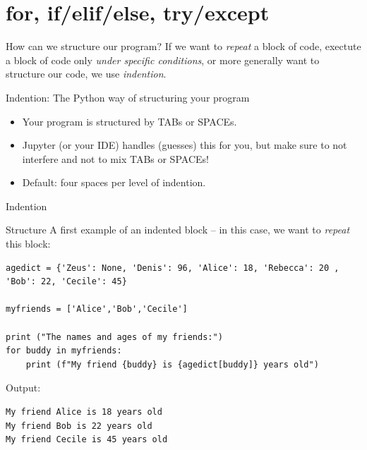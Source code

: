 \documentclass{beamer}
\begin{document}
\section{for, if/elif/else, try/except}

\begin{frame}[fragile]{How can we structure our program?}
If we want to \emph{repeat} a block of code, exectute a block of code only \emph{under specific conditions}, or more generally want to structure our code, we use \emph{indention}.

	\begin{block}{Indention: The Python way of structuring your program}
		\begin{itemize}
			\item Your program is structured by TABs or SPACEs.
			\item Jupyter (or your IDE) handles (guesses) this for you, but make sure to not interfere and not to mix TABs or SPACEs!
			\item Default: four spaces per level of indention.
		\end{itemize}
	\end{block}
\end{frame}



\begin{frame}[fragile]{Indention}
\begin{block}{Structure}
	A first example of an indented block -- in this case, we want to \emph{repeat} this block:
\end{block}
\begin{lstlisting}
agedict = {'Zeus': None, 'Denis': 96, 'Alice': 18, 'Rebecca': 20 , 'Bob': 22, 'Cecile': 45}

myfriends = ['Alice','Bob','Cecile']

print ("The names and ages of my friends:")
for buddy in myfriends:
	print (f"My friend {buddy} is {agedict[buddy]} years old")
\end{lstlisting}

Output:
\begin{lstlisting}
My friend Alice is 18 years old
My friend Bob is 22 years old
My friend Cecile is 45 years old
\end{lstlisting}
\end{frame}
\end{document}
